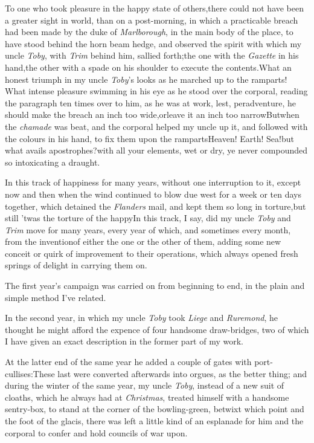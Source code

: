 \documentclass{article}
\begin{document}
\newpage
To one who took pleasure in the happy state of others,\tsk there
could not have been a greater sight in world, than on a
post-morning, in which a practicable breach had been made by the
duke of \textit{Marlborough}, in the main body of the place,\tsk
to have stood behind the horn beam hedge, and observed the
spirit with which my uncle \textit{Toby}, with \textit{Trim}
behind him, sallied forth;\tsh the one with the \textit{Gazette}
in his hand,\tsk the other with a spade on his shoulder to
execute the contents.\tsh What an honest triumph in my uncle
\textit{Toby}’s looks as he marched up to the ramparts! What
intense pleasure swimming in his eye as he stood over the
corporal, reading the paragraph ten times over to him, as he was
at work, lest, peradventure, he should make the breach an inch
too wide,\tsk or\pb leave it an inch too narrow\tsh But\break when
the \textit{chamade} was beat, and the corporal helped my uncle
up it, and followed with the colours in his hand, to fix them
upon the ramparts\tsk Heaven! Earth!  Sea!\tsh but what avails
apostrophes?\tsh with all your elements, wet or dry, ye never
compounded so intoxicating a draught.

In this track of happiness for many years, without one
interruption to it, except now and then when the wind continued to
blow due west for a week or ten days together, which detained the
\textit{Flanders} mail, and kept them so long in torture,\tsk but
still ’twas the torture of the happy\tsh In this
track, I say, did my uncle \textit{Toby} and \textit{Trim} move for
many years, every year of which, and sometimes every
month, from the invention\pb of either the one or the other of them,
adding some new conceit or quirk of improvement to their
operations, which always opened fresh springs of delight in
carrying them on.

The first year’s campaign was carried on from beginning to
end, in the plain and simple method I’ve related.

In the second year, in which my uncle \textit{Toby} took
\textit{Liege} and \textit{Ruremond}, he thought he might afford the
expence of four handsome draw-bridges, two of which I have given
an exact description in the former part of my work.

At the latter end of the same year he added a couple of gates
with port-cullises:\tsh These last were converted
afterwards into orgues, as the better thing;\pb
and during the winter of the same year, my uncle \textit{Toby},
instead of a new suit of cloaths, which he always had at
\textit{Christmas}, treated himself with a handsome sentry-box,
to stand at the corner of the bowling-green, betwixt which point
and the foot of the glacis, there was left a little kind of an
esplanade for him and the corporal to confer and hold councils
of war upon.
\end{document}
